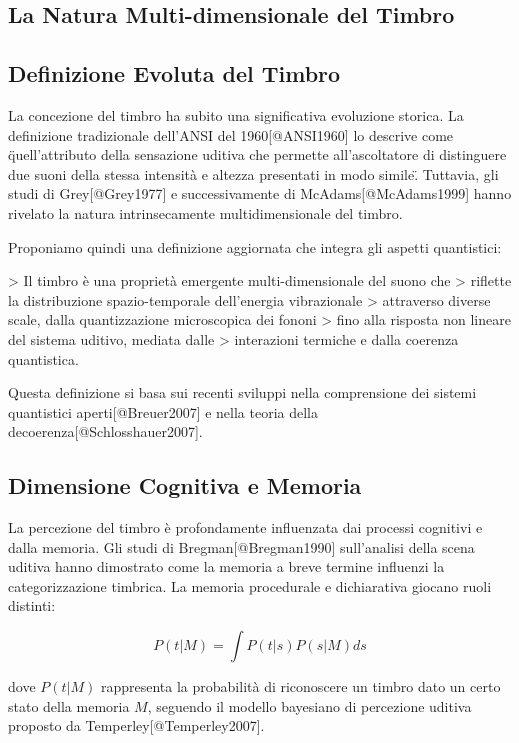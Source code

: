 \documentclass[a4paper,11pt]{article}
\begin{document}
\subsection{La Natura Multi-dimensionale del Timbro}

\subsection{Definizione Evoluta del Timbro}

La concezione del timbro ha subito una significativa evoluzione storica.
La definizione tradizionale dell'ANSI del 1960[@ANSI1960] lo descrive
come \"quell'attributo della sensazione uditiva che permette
all'ascoltatore di distinguere due suoni della stessa intensità e
altezza presentati in modo simile\". Tuttavia, gli studi di
Grey[@Grey1977] e successivamente di McAdams[@McAdams1999] hanno
rivelato la natura intrinsecamente multidimensionale del timbro.

Proponiamo quindi una definizione aggiornata che integra gli aspetti
quantistici:

> Il timbro è una proprietà emergente multi-dimensionale del suono che
> riflette la distribuzione spazio-temporale dell'energia vibrazionale
> attraverso diverse scale, dalla quantizzazione microscopica dei fononi
> fino alla risposta non lineare del sistema uditivo, mediata dalle
> interazioni termiche e dalla coerenza quantistica.

Questa definizione si basa sui recenti sviluppi nella comprensione dei
sistemi quantistici aperti[@Breuer2007] e nella teoria della
decoerenza[@Schlosshauer2007].

\subsection{Dimensione Cognitiva e Memoria}

La percezione del timbro è profondamente influenzata dai processi
cognitivi e dalla memoria. Gli studi di Bregman[@Bregman1990]
sull'analisi della scena uditiva hanno dimostrato come la memoria a
breve termine influenzi la categorizzazione timbrica. La memoria
procedurale e dichiarativa giocano ruoli distinti:

\begin{equation}
P(t|M) = \int P(t|s)P(s|M)ds
\end{equation}


dove $P(t|M)$ rappresenta la probabilità di riconoscere un timbro dato
un certo stato della memoria $M$, seguendo il modello bayesiano di
percezione uditiva proposto da Temperley[@Temperley2007].
\end{document}
